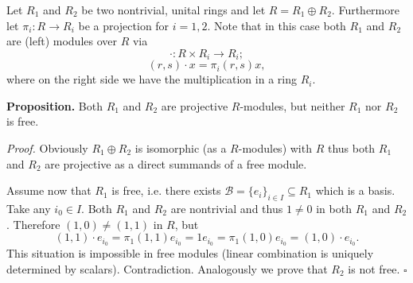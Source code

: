 \documentclass[12pt]{article}
\begin{document}
Let $R_1$ and $R_2$ be two nontrivial, unital rings and let $R=R_1\oplus R_2$. Furthermore let $\pi_i:R\to R_i$ be a projection for $i=1,2$. Note that in this case both $R_1$ and $R_2$ are (left) modules over $R$ via
$$\cdot:R\times R_i\to R_i;$$
$$(r,s)\cdot x = \pi_i(r,s)x,$$
where on the right side we have the multiplication in a ring $R_i$.

\textbf{Proposition.} Both $R_1$ and $R_2$ are projective $R$-modules, but neither $R_1$ nor $R_2$ is free.

\textit{Proof.} Obviously $R_1\oplus R_2$ is isomorphic (as a $R$-modules) with $R$ thus both $R_1$ and $R_2$ are projective as a direct summands of a free module.

Assume now that $R_1$ is free, i.e. there exists $\mathcal{B}=\{e_i\}_{i\in I}\subseteq R_1$ which is a basis. Take any $i_0\in I$. Both $R_1$ and $R_2$ are nontrivial and thus $1\neq 0$ in both $R_1$ and $R_2$. Therefore $(1,0)\neq (1,1)$ in $R$, but $$(1,1)\cdot e_{i_0}=\pi_1(1,1)e_{i_0}=1 e_{i_0}=\pi_1(1,0) e_{i_0}=(1,0)\cdot e_{i_0}.$$
This situation is impossible in free modules (linear combination is uniquely determined by scalars). Contradiction. Analogously we prove that $R_2$ is not free. $\square$
\end{document}
